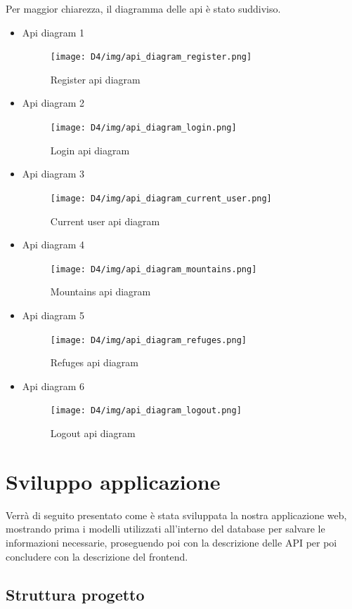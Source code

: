 \documentclass[a4paper,12pt]{article}
\begin{document}
Per maggior chiarezza, il diagramma delle api è stato suddiviso.
\begin{itemize}
    \item Api diagram 1
    \begin{figure}[H]
    \centering
   \texttt{[image: D4/img/api\_diagram\_register.png]}
    \caption{Register api diagram}
    \end{figure}
    
    \item Api diagram 2
    \begin{figure}[H]
   \centering
   \texttt{[image: D4/img/api\_diagram\_login.png]}
    \caption{Login api diagram}
\end{figure}

    \item Api diagram 3
        \begin{figure}[H]
       \centering
       \texttt{[image: D4/img/api\_diagram\_current\_user.png]}
        \caption{Current user api diagram}
    \end{figure}

    \item Api diagram 4
    \begin{figure}[H]
    \centering
   \texttt{[image: D4/img/api\_diagram\_mountains.png]}
    \caption{Mountains api diagram}
\end{figure}
    \item Api diagram 5
    \begin{figure}[H]
   \centering
   \texttt{[image: D4/img/api\_diagram\_refuges.png]}
    \caption{Refuges api diagram}
\end{figure}
    \item Api diagram 6
    \begin{figure}[H]
   \centering
   \texttt{[image: D4/img/api\_diagram\_logout.png]}
    \caption{Logout api diagram}
\end{figure}
\end{itemize}

\newpage
\section{Sviluppo applicazione}
Verrà di seguito presentato come è stata sviluppata la nostra applicazione web, mostrando prima i modelli utilizzati all'interno del database per salvare le informazioni necessarie, proseguendo poi con la descrizione delle API per poi concludere con la descrizione del frontend.

\subsection{Struttura progetto}
\end{document}
